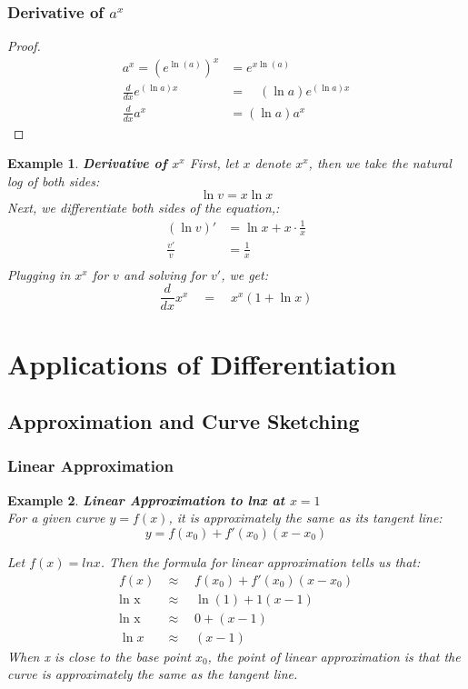 \documentclass[10pt, a4paper]{article}
\newtheorem{example}{Example}
\begin{document}
\subsubsection*{Derivative of $a^x$}
\begin{proof}
    \begin{align*}
        a^x=\left(e^{\ln(a)}\right)^x &=e^{x\ln(a)} \\
        \frac d{dx}e^{(\ln a)x}\quad &=\quad(\ln a)e^{(\ln a)x} \\
        \frac d{dx}a^x &=(\ln a)a^x
    \end{align*}

\end{proof}

\begin{example}
    \textbf{Derivative of $x^x$}
    First, let $x$ denote $x^x$, then we take the natural log of both sides:
    \[\ln v = x\ln x\]
    Next, we differentiate both sides of the equation,:
    \begin{align*}
        (\ln v)' &= \ln x + x\cdot\frac{1}{x} \\
        \frac{v'}{v} &= \frac{1}{x} \\  
    \end{align*}
    Plugging in $x^x$ for $v$ and solving for $v'$, we get:
    \[\frac d{dx}x^x\quad=\quad x^x(1+\ln x)\]
\end{example}
    
\section{Applications of Differentiation}
\subsection{Approximation and Curve Sketching}
\subsubsection*{Linear Approximation}
\begin{example}
    \textbf{Linear Approximation to lnx at $x=1$} \\
    For a given curve \(y = f(x)\), it is approximately the same as its tangent line:
    \[ \boxed{y = f(x_0) + f'(x_0)(x - x_0)} \]
    
    Let $f(x) = lnx$. Then the formula for linear approximation tells us that:
    \begin{align*}
        f(x)& \approx\quad f(x_0)+f'(x_0)(x-x_0) \\
       \text{ln x} &\approx\quad\ln(1)+1(x-1)  \\
        \text{ln x} &\approx\quad0+(x-1)  \\
        \operatorname{ln}x &\approx\quad(x-1) 
    \end{align*}
    When x is close to the base point $x_0$, the point of linear approximation is that the curve is
    approximately the same as the tangent line.
\end{example}
\end{document}
